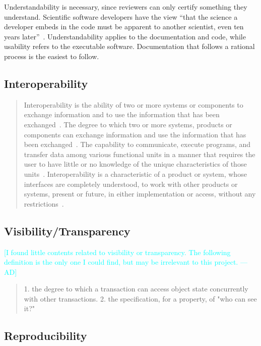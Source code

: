 \documentclass[letterpaper,cleveref]{lipics-v2019}
\newcommand{\authornote}[3]{\textcolor{#1}{[#3 ---#2]}}
\newcommand{\authornote}[3]{}
\newcommand{\ad}[1]{\authornote{cyan}{AD}{#1}} %
\begin{document}
Understandability is necessary, since reviewers can only certify something they
understand.  Scientific software developers have the view ``that the science a
developer embeds in the code must be apparent to another scientist, even ten
years later''~\cite{Kelly2013}.  Understandability applies to the documentation
and code, while usability refers to the executable software.  Documentation that
follows a rational process is the easiest to follow.

\subsection{Interoperability}

\begin{quotation}
	\noindent Interoperability is the ability of two or more systems or components to exchange information and to use the information that has been exchanged~\cite{IEEE1991}.
	\noindent The degree to which two or more systems, products or components can exchange information and use the information that has been exchanged~\cite{ISO/IEC25010}.
	\noindent The capability to communicate, execute programs, and transfer data among various functional units in a manner that requires the user to have little or no knowledge of the unique characteristics of those units~\cite{ISO/IEC/IEEE24765}.
	\noindent Interoperability is a characteristic of a product or system, whose interfaces are completely understood, to work with other products or systems, present or future, in either implementation or access, without any restrictions~\cite{AFUL}.
\end{quotation}

\subsection{Visibility/Transparency}
    \ad{I found little contents related to visibility or transparency. The following definition is the only one I could find, but may be irrelevant to this project.}
    \begin{quotation}
        1. the degree to which a transaction can access object state concurrently with other transactions. 2. the specification, for a property, of "who can see it?"~\cite{ISO/IEC/IEEE24765}
    \end{quotation}
\subsection{Reproducibility}
\end{document}
